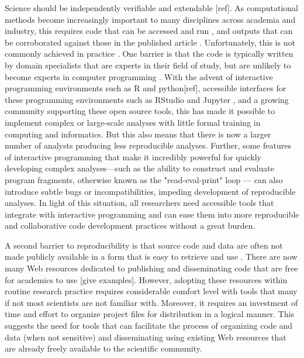 \documentclass[9pt,a4paper]{extarticle}
\begin{document}
Science should be independently verifiable and extendable [ref]. As
computational methods become increasingly important to many disciplines
across academia and industry, this requires code that can be accessed
and run , and outputs that can be corroborated against those in the
published article \cite{Buckheit1995, Gentleman2005, Peng2011, Ince2012,
Morin2012, Sandve2013, Easterbrook2014, Stodden2016, Lowndes2017}.
Unfortunately, this is not commonly achieved in practice
\cite{Ioannidis2009, Ioannidis2014}. One barrier is that the code is
typically written by domain specialists that are experts in their field
of study, but are unlikely to become experts in computer programming
\cite{Wilson2014b}. With the advent of interactive programming
environments such as R \cite{R2019} and python[ref], accessible
interfaces for these programming environments such as RStudio
\cite{RStudio2018} and Jupyter \cite{Kluyver2016}, and a growing
community supporting these open source tools, this has made it possible
to implement complex or large-scale analyses with little formal training
in computing and informatics. But this also means that there is now a
larger number of analysts producing less reproducible analyses. Further,
some features of interactive programming that make it incredibly
powerful for quickly developing complex analyses—such as the ability to
construct and evaluate program fragments, otherwise known as the
"read-eval-print" loop \cite{Findler2002}— can also introduce subtle
bugs or incompatibilities, impeding development of reproducible
analyses. In light of this situation, all researchers need accessible
tools that integrate with interactive programming and can ease them into
more reproducible and collaborative code development practices without a
great burden.

A second barrier to reproducibility is that source code and data are
often not made publicly available in a form that is easy to retrieve and
use \cite{Stodden2018}. There are now many Web resources dedicated to
publishing and disseminating code that are free for academics to use
[give examples]. However, adopting these resources within routine
research practice requires considerable comfort level with tools that
many if not most scientists are not familiar with. Moreover, it requires
an investment of time and effort to organize project files for
distribution in a logical manner. This suggests the need for tools that
can facilitate the process of organizing code and data (when not
sensitive) and disseminating using existing Web resources that are
already freely available to the scientific community.
\end{document}
